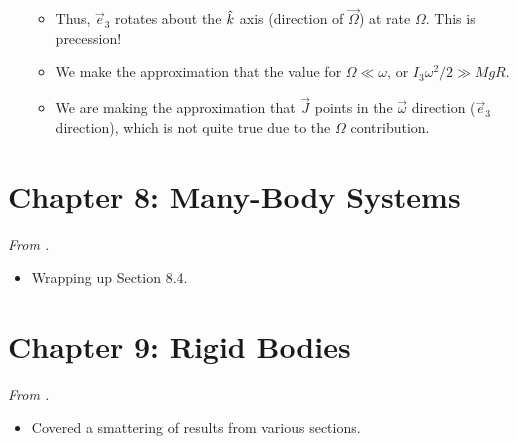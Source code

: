 \documentclass[../notes.tex]{subfiles}
\begin{document}
\begin{itemize}
\begin{itemize}
\begin{equation*}
        \end{equation*}
        \item Thus, $\vec{e}_3$ rotates about the $\hat{k}$ axis (direction of $\vec{\Omega}$) at rate $\Omega$. This is precession!
        \item We make the approximation that the value for $\Omega\ll\omega$, or $I_3\omega^2/2\gg MgR$.
        \item We are making the approximation that $\vec{J}$ points in the $\vec{\omega}$ direction ($\vec{e}_3$ direction), which is not quite true due to the $\Omega$ contribution.
    \end{itemize}
\end{itemize}



\section{Chapter 8: Many-Body Systems}
\emph{From \textcite{bib:KibbleBerkshire}.}
\begin{itemize}
    \item {}Wrapping up Section 8.4.
\end{itemize}



\section{Chapter 9: Rigid Bodies}
\emph{From \textcite{bib:KibbleBerkshire}.}
\begin{itemize}
    \item Covered a smattering of results from various sections.
\end{itemize}
\end{document}
